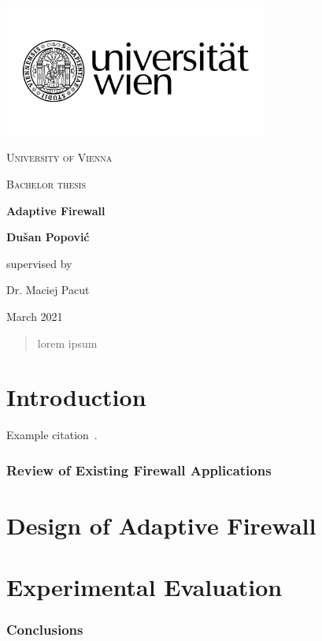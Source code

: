 \documentclass[11pt]{article}
\begin{document}
\begin{titlepage}
	\centering
	\includegraphics[width=0.65\textwidth]{unilogo.jpg}\par
	{\scshape\LARGE University of Vienna\par}
	\vspace{2cm}
	{\scshape\Large Bachelor thesis\par}
	\vspace{1cm}
	{\huge\bfseries
		Adaptive Firewall
		\par}
	\vspace{3cm}
	{\huge \bfseries Dušan Popović\par}
	\vfill
	{\Large supervised by\par
		Dr. Maciej Pacut}

	\vfill

	{\large March 2021 \par}
\end{titlepage}

\hspace{0pt}
\vfill

\begin{abstract}
lorem ipsum	
\end{abstract}

\vfill

\hspace{0pt}
\thispagestyle{empty}

\newpage
\thispagestyle{empty}
\mbox{}


\tableofcontents

\newpage

\part{Introduction}

Example citation~\cite{tcp-ack}.

\section{Review of Existing Firewall Applications}

\part{Design of Adaptive Firewall}

\part{Experimental Evaluation}

\section{Conclusions}



\end{document}
